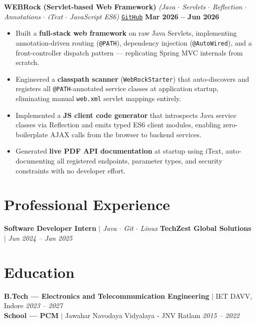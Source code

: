 \documentclass[a4paper,10pt]{article}
\begin{document}
\vspace{0.5mm}

\textbf{WEBRock (Servlet-based Web Framework)} \textit{(Java $\cdot$ Servlets $\cdot$ Reflection $\cdot$ Annotations $\cdot$ iText $\cdot$ JavaScript ES6)}
\hfill \href{https://github.com/ashvin-parmar/webrock}{\texttt{GitHub}} \quad \textbf{Mar 2026 -- Jun 2026}
\begin{itemize}
  \item Built a \textbf{full-stack web framework} on raw Java Servlets, implementing annotation-driven routing (\texttt{@PATH}), dependency injection (\texttt{@AutoWired}), and a front-controller dispatch pattern --- replicating Spring MVC internals from scratch.
  \item Engineered a \textbf{classpath scanner} (\texttt{WebRockStarter}) that auto-discovers and registers all \texttt{@PATH}-annotated service classes at application startup, eliminating manual \texttt{web.xml} servlet mappings entirely.
  \item Implemented a \textbf{JS client code generator} that introspects Java service classes via Reflection and emits typed ES6 client modules, enabling zero-boilerplate AJAX calls from the browser to backend services.
  \item Generated \textbf{live PDF API documentation} at startup using iText, auto-documenting all registered endpoints, parameter types, and security constraints with no developer effort.
\end{itemize}

\section*{Professional Experience}

\textbf{Software Developer Intern} $|$ \textit{Java $\cdot$ Git $\cdot$ Linux} \hfill \textbf{TechZest Global Solutions} $|$ \textit{Jun 2024 -- Jan 2025}

\section*{Education}
\textbf{B.Tech --- Electronics and Telecommunication Engineering} $|$ IET DAVV, Indore \hfill \textit{2023 -- 2027} \\
\textbf{School --- PCM} $|$ Jawahar Navodaya Vidyalaya - JNV Ratlam \hfill \textit{2015 -- 2022}
\end{document}
